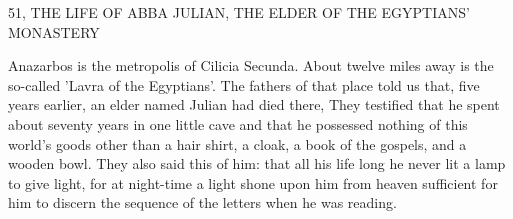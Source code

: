 51, THE LIFE OF ABBA JULIAN,
THE ELDER OF THE EGYPTIANS' MONASTERY

Anazarbos is the metropolis of Cilicia Secunda. About twelve miles
away is the so-called 'Lavra of the Egyptians'. The fathers of that
place told us that, five years earlier, an elder named Julian had died
there, They testified that he spent about seventy years in one little
cave and that he possessed nothing of this world's goods other than
a hair shirt, a cloak, a book of the gospels, and a wooden bowl.
They also said this of him: that all his life long he never lit a lamp
to give light, for at night-time a light shone upon him from heaven
sufficient for him to discern the sequence of the letters when he was
reading.

